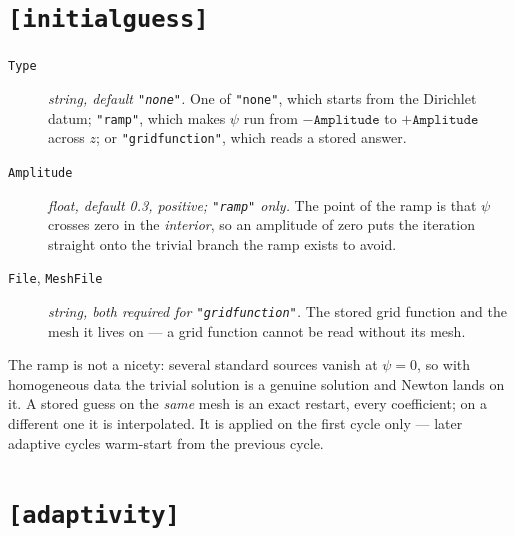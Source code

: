 \section{\texttt{[initialguess]}}

\begin{description}

\item[\texttt{Type}] \emph{string, default \texttt{"none"}.} One of
	\texttt{"none"}, which starts from the Dirichlet datum; \texttt{"ramp"},
	which makes $\psi$ run from $-\texttt{Amplitude}$ to $+\texttt{Amplitude}$
	across $z$; or \texttt{"gridfunction"}, which reads a stored answer.

\item[\texttt{Amplitude}] \emph{float, default 0.3, positive; \texttt{"ramp"}
	only.} The point of the ramp is that $\psi$ crosses zero in the
	\emph{interior}, so an amplitude of zero puts the iteration straight onto
	the trivial branch the ramp exists to avoid.

\item[\texttt{File}, \texttt{MeshFile}] \emph{string, both required for
	\texttt{"gridfunction"}.} The stored grid function and the mesh it lives on
	--- a grid function cannot be read without its mesh.

\end{description}

The ramp is not a nicety: several standard sources vanish at $\psi = 0$, so with
homogeneous data the trivial solution is a genuine solution and Newton lands on
it. A stored guess on the \emph{same} mesh is an exact restart, every
coefficient; on a different one it is interpolated. It is applied on the first
cycle only --- later adaptive cycles warm-start from the previous cycle.

\section{\texttt{[adaptivity]}}


